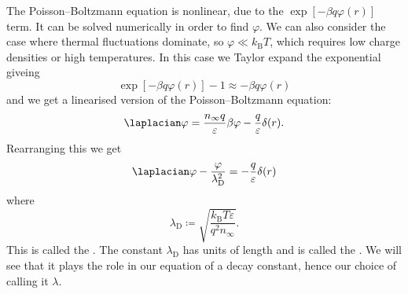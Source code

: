 \documentclass[fleqn]{NotesClass}
\newcommand*{\boltzmann}{k_{\mathrm{B}}}
\begin{document}
    The Poisson--Boltzmann equation is nonlinear, due to the \(\exp[-\beta q\varphi(r)]\) term.
    It can be solved numerically in order to find \(\varphi\).
    We can also consider the case where thermal fluctuations dominate, so \(\varphi \ll \boltzmann T\), which requires low charge densities or high temperatures.
    In this case we Taylor expand the exponential giveing
    \begin{equation}
        \exp[-\beta q \varphi(r)] - 1 \approx -\beta q \varphi(r)
    \end{equation}
    and we get a linearised version of the Poisson--Boltzmann equation:
    \begin{equation}
        \laplacian \varphi = \frac{n_{\infty}q}{\varepsilon} \beta\varphi - \frac{q}{\varepsilon}\delta(r).
    \end{equation}
    Rearranging this we get
    \begin{equation}
        \laplacian\varphi - \frac{\varphi}{\lambda_{\mathrm{D}}^2} = -\frac{q}{\varepsilon}\delta(r)
    \end{equation}
    where
    \begin{equation}
        \lambda_{\mathrm{D}} \coloneqq \sqrt{\frac{\boltzmann T\varepsilon}{q^2n_{\infty}}}.
    \end{equation}
    This is called the .
    The constant \(\lambda_{\mathrm{D}}\) has units of length and is called the .
    We will see that it plays the role in our equation of a decay constant, hence our choice of calling it \(\lambda\).
    
\end{document}
